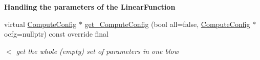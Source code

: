 \begin{Indent}\textbf{ Handling the parameters of the Linear\+Function}\par
\begin{DoxyCompactItemize}
\item 
virtual \mbox{\hyperlink{class_s_m_spp__di__unipi__it_1_1_compute_config}{Compute\+Config}} $\ast$ \mbox{\hyperlink{class_s_m_spp__di__unipi__it_1_1_linear_function_a8c965c848816d9acca40c995164e5773}{get\+\_\+\+Compute\+Config}} (bool all=false, \mbox{\hyperlink{class_s_m_spp__di__unipi__it_1_1_compute_config}{Compute\+Config}} $\ast$ocfg=nullptr) const override final
\begin{DoxyCompactList}\small\item\em $<$ get the whole (empty) set of parameters in one blow \end{DoxyCompactList}\end{DoxyCompactItemize}
\end{Indent}
